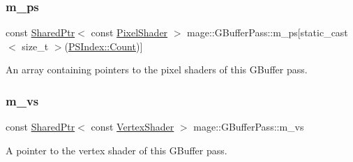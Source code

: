 \subsubsection{\texorpdfstring{m\+\_\+ps}{m\_ps}}
{\footnotesize\ttfamily const \hyperlink{namespacemage_a1e01ae66713838a7a67d30e44c67703e}{Shared\+Ptr}$<$ const \hyperlink{namespacemage_a27ecaf266420ee7a494d64edc0757129}{Pixel\+Shader} $>$ mage\+::\+G\+Buffer\+Pass\+::m\+\_\+ps\mbox{[}static\+\_\+cast$<$ size\+\_\+t $>$(\hyperlink{classmage_1_1_g_buffer_pass_a1dbae3cb33d9c90ce7eb8c119d576379ae93f994f01c537c4e2f7d8528c3eb5e9}{P\+S\+Index\+::\+Count})\mbox{]}\hspace{0.3cm}{\ttfamily [private]}}

An array containing pointers to the pixel shaders of this G\+Buffer pass. \hypertarget{classmage_1_1_g_buffer_pass_a5baced2ca3d5018e35d25d6c1b5d8f20}{}\label{classmage_1_1_g_buffer_pass_a5baced2ca3d5018e35d25d6c1b5d8f20} 
\subsubsection{\texorpdfstring{m\+\_\+vs}{m\_vs}}
{\footnotesize\ttfamily const \hyperlink{namespacemage_a1e01ae66713838a7a67d30e44c67703e}{Shared\+Ptr}$<$ const \hyperlink{classmage_1_1_vertex_shader}{Vertex\+Shader} $>$ mage\+::\+G\+Buffer\+Pass\+::m\+\_\+vs\hspace{0.3cm}{\ttfamily [private]}}

A pointer to the vertex shader of this G\+Buffer pass. 